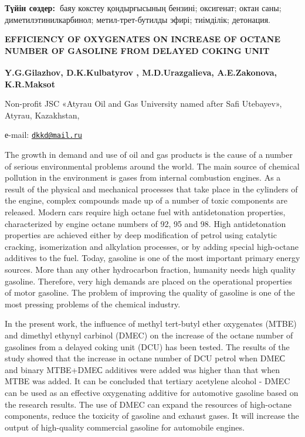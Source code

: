 {\bfseries Түйін сөздер:~}баяу кокстеу қондырғысының бензині; оксигенат;
октан саны; диметилэтинилкарбинол; метил-трет-бутилды эфирі; тиімділік;
детонация.

{\bfseries EFFICIENCY OF OXYGENATES ON INCREASE OF OCTANE NUMBER OF
GASOLINE FROM DELAYED COKING UNIT}

{\bfseries Y.G.Gilazhov, D.K.Kulbatyrov\textsuperscript{\envelope } ,
M.D.Urazgalieva, A.E.Zakonova, K.R.Maksot}

Non-profit JSC «Atyrau Oil and Gas University named after Safi
Utebayev», Atyrau, Kazakhstan,

е-mail: \href{mailto:dkkd@mail.ru}{\nolinkurl{dkkd@mail.ru}}

The growth in demand and use of oil and gas products is the cause of a
number of serious environmental problems around the world. The main
source of chemical pollution in the environment is gases from internal
combustion engines. As a result of the physical and mechanical processes
that take place in the cylinders of the engine, complex compounds made
up of a number of toxic components are released. Modern cars require
high octane fuel with antidetonation properties, characterized by engine
octane numbers of 92, 95 and 98. High antidetonation properties are
achieved either by deep modification of petrol using catalytic cracking,
isomerization and alkylation processes, or by adding special high-octane
additives to the fuel. Today, gasoline is one of the most important
primary energy sources. More than any other hydrocarbon fraction,
humanity needs high quality gasoline. Therefore, very high demands are
placed on the operational properties of motor gasoline. The problem of
improving the quality of gasoline is one of the most pressing problems
of the chemical industry.

In the present work, the influence of methyl tert-butyl ether oxygenates
(MTBE) and dimethyl ethynyl carbinol (DMEC) on the increase of the
octane number of gasolines from a delayed coking unit (DCU) has been
tested. The results of the study showed that the increase in octane
number of DCU petrol when DMEС and binary MTBE+DMEС additives were added
was higher than that when MTBE was added. It can be concluded that
tertiary acetylene alcohol - DMEC can be used as an effective
oxygenating additive for automotive gasoline based on the research
results. The use of DMEC can expand the resources of high-octane
components, reduce the toxicity of gasoline and exhaust gases. It will
increase the output of high-quality commercial gasoline for automobile
engines.

